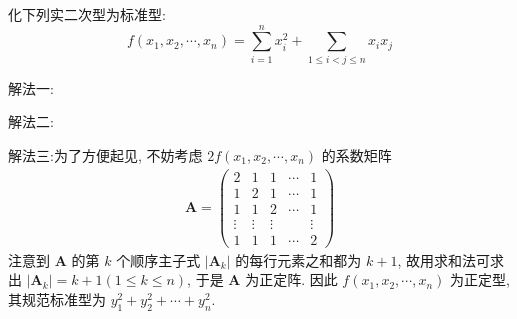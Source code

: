 \documentclass[../../main.tex]{subfiles}%
\begin{document}
\begin{example}
化下列实二次型为标准型:
\[f(x_1,x_2,\cdots,x_n)=\sum_{i = 1}^{n}x_i^2+\sum_{1\leqslant  i < j\leqslant  n}x_ix_j\]
\end{example}
\begin{solution}

{\color{blue}解法一:}

{\color{blue}解法二:}

{\color{blue}解法三:}为了方便起见, 不妨考虑 \(2f(x_1,x_2,\cdots,x_n)\) 的系数矩阵
\begin{align*}
\boldsymbol{A} = \begin{pmatrix}
2 & 1 & 1 & \cdots & 1 \\
1 & 2 & 1 & \cdots & 1 \\
1 & 1 & 2 & \cdots & 1 \\
\vdots & \vdots & \vdots & & \vdots \\
1 & 1 & 1 & \cdots & 2
\end{pmatrix}
\end{align*}
注意到 \(\boldsymbol{A}\) 的第 \(k\) 个顺序主子式 \(|\boldsymbol{A}_k|\) 的每行元素之和都为 \(k + 1\), 故用求和法可求出 \(|\boldsymbol{A}_k| = k + 1(1\leqslant  k\leqslant  n)\), 于是 \(\boldsymbol{A}\) 为正定阵. 因此 \(f(x_1,x_2,\cdots,x_n)\) 为正定型, 其规范标准型为 \(y_1^2 + y_2^2 + \cdots + y_n^2\). 

\end{solution}
\end{document}
